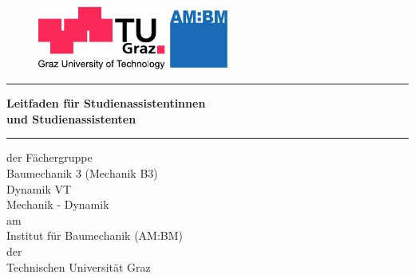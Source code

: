 %
%
\begin{titlepage}
        \begin{figure}[htbp]
        \hspace{.05\linewidth}
            \begin{minipage}[b]{.6\linewidth}
                \includegraphics[width=4.2cm]{coverPics/logo_lang_V8.pdf}
            \end{minipage}
            \hspace{.2\linewidth}
        \begin{minipage}[b]{.2\linewidth}
                \includegraphics[width=2cm]{coverPics/AM_BM.pdf}
        \end{minipage}
        \end{figure}

        \vspace*{3mm}
    \hrule

    \fontsize{16pt}{24pt}\selectfont


\begin{center}
    \vspace{30mm}
        \textsf{\textbf{Leitfaden f\"{u}r Studienassistentinnen\\
          und Studienassistenten}}
    \normalfont

    \vspace{10mm}
        \hrule
    \vspace{10mm}
    \normalsize{der F\"{a}chergruppe}\\
    \vspace{5mm}
    \Large{Baumechanik 3 (Mechanik B3)}\\
    \Large{Dynamik VT}\\
    \Large{Mechanik - Dynamik}\\ 
    \vspace{5mm}
    \normalsize{am}\\
    \vspace{5mm}
    \Large{Institut f\"{u}r Baumechanik (AM:BM) \\ der 
          \\ Technischen Universit\"{a}t Graz} \\


\end{center}
\end{titlepage}
